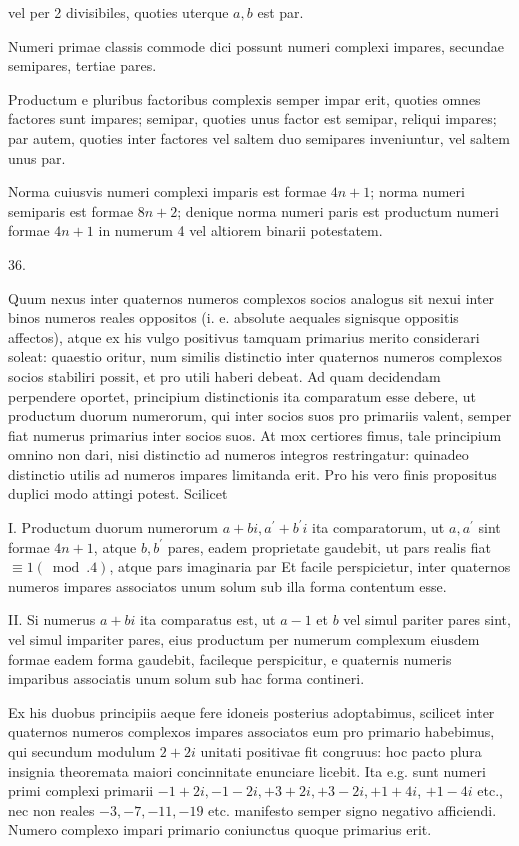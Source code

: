 \documentclass[10pt]{article}
\begin{document}
vel per 2 divisibiles, quoties uterque \(a, b\) est par.

Numeri primae classis commode dici possunt numeri complexi impares, secundae semipares, tertiae pares.

Productum e pluribus factoribus complexis semper impar erit, quoties omnes factores sunt impares; semipar, quoties unus factor est semipar, reliqui impares; par autem, quoties inter factores vel saltem duo semipares inveniuntur, vel saltem unus par.

Norma cuiusvis numeri complexi imparis est formae \(4 n+1\); norma numeri semiparis est formae \(8 n+2\); denique norma numeri paris est productum numeri formae \(4 n+1\) in numerum 4 vel altiorem binarii potestatem.

36.

Quum nexus inter quaternos numeros complexos socios analogus sit nexui inter binos numeros reales oppositos (i. e. absolute aequales signisque oppositis affectos), atque ex his vulgo positivus tamquam primarius merito considerari soleat:
quaestio oritur, num similis distinctio inter quaternos numeros complexos socios stabiliri possit, et pro utili haberi debeat. Ad quam decidendam perpendere oportet, principium distinctionis ita comparatum esse debere, ut productum duorum numerorum, qui inter socios suos pro primariis valent, semper fiat numerus primarius inter socios suos. At mox certiores fimus, tale principium omnino non dari, nisi distinctio ad numeros integros restringatur: quinadeo distinctio utilis ad numeros impares limitanda erit. Pro his vero finis propositus duplici modo attingi potest. Scilicet

I. Productum duorum numerorum \(a+b i, a^{\prime}+b^{\prime} i\) ita comparatorum, ut \(a, a^{\prime}\) sint formae \(4 n+1\), atque \(b, b^{\prime}\) pares, eadem proprietate gaudebit, ut pars realis fiat \(\equiv 1(\bmod .4)\), atque pars imaginaria par Et facile perspicietur, inter quaternos numeros impares associatos unum solum sub illa forma contentum esse.

II. Si numerus \(a+b i\) ita comparatus est, ut \(a-1\) et \(b\) vel simul pariter pares sint, vel simul impariter pares, eius productum per numerum complexum eiusdem formae eadem forma gaudebit, facileque perspicitur, e quaternis numeris imparibus associatis unum solum sub hac forma contineri.

Ex his duobus principiis aeque fere idoneis posterius adoptabimus, scilicet inter quaternos numeros complexos impares associatos eum pro primario habebimus, qui secundum modulum \(2+2 i\) unitati positivae fit congruus: hoc pacto plura insignia theoremata maiori concinnitate enunciare licebit. Ita e.g. sunt numeri primi complexi primarii \(-1+2 i,-1-2 i,+3+2 i,+3-2 i,+1+4 i\), \(+1-4 i\) etc., nec non reales \(-3,-7,-11,-19\) etc. manifesto semper signo negativo afficiendi. Numero complexo impari primario coniunctus quoque primarius erit.
\end{document}
